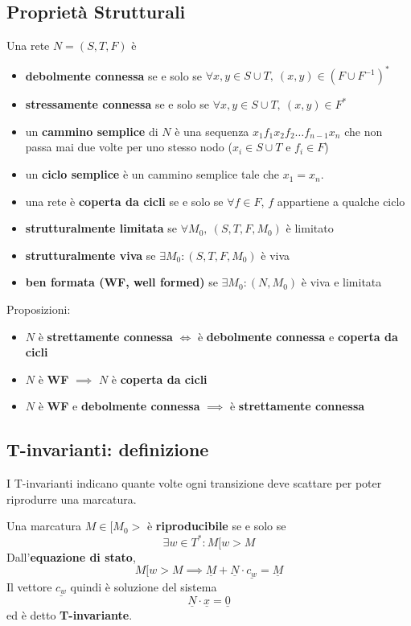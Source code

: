 \subsection{Proprietà Strutturali}

Una rete $N = (S, T, F)$ è
\begin{itemize}
	\item \textbf{debolmente connessa} se e solo se $\forall x, y \in S \cup T, \ (x, y) \in (F \cup F^{-1})^*$
	\item \textbf{stressamente connessa} se e solo se $\forall x, y \in S \cup T, \ (x, y) \in F^*$
	\item un \textbf{cammino semplice} di $N$ è una sequenza $x_1 f_1 x_2 f_2 \dots f_{n-1} x_n$ che non passa mai due volte per uno stesso nodo ($x_i \in S \cup T$ e $f_i \in F$)
	\item un \textbf{ciclo semplice} è un cammino semplice tale che $x_1 = x_n$.
	\item una rete è \textbf{coperta da cicli} se e solo se $\forall f \in F$, $f$ appartiene a qualche ciclo
	\item \textbf{strutturalmente limitata} se $\forall M_0, \ (S, T, F, M_0)$ è limitato
	\item \textbf{strutturalmente viva} se $\exists M_0 : (S, T, F, M_0)$ è viva
	\item \textbf{ben formata (WF, well formed)} se $\exists M_0 : (N, M_0)$ è viva e limitata
\end{itemize}

Proposizioni:
\begin{itemize}
	\item $N$ è \textbf{strettamente connessa} $\iff$ è \textbf{debolmente connessa} e \textbf{coperta da cicli}
	\item $N$ è \textbf{WF} $\implies$ $N$ è \textbf{coperta da cicli}
	\item $N$ è \textbf{WF} e \textbf{debolmente connessa} $\implies$ è \textbf{strettamente connessa}
\end{itemize}

\subsection{T-invarianti: definizione}

I T-invarianti indicano quante volte ogni transizione deve scattare per poter riprodurre una marcatura.

Una marcatura $M \in [M_0>$ è \textbf{riproducibile} se e solo se
\[\exists w \in T^* : M[w > M \]
Dall'\textbf{equazione di stato},
\[
	M[w>M \implies \underline M + \underline N \cdot \underline{c_w} = \underline M
\]
Il vettore $\underline{c_w}$ quindi è soluzione del sistema
\[ \underline N \cdot \underline x = \underline 0\]
ed è detto \textbf{T-invariante}.

